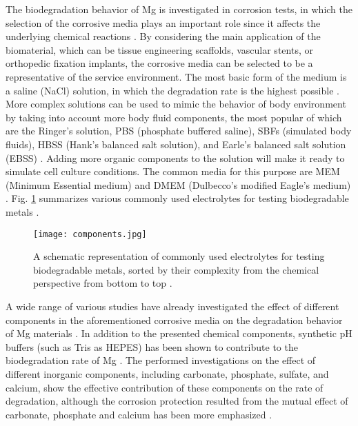 The biodegradation behavior of Mg is investigated in corrosion tests, in which the selection of the corrosive media plays an important role since it affects the underlying chemical reactions \cite{Mei2020}. By considering the main application of the biomaterial, which can be tissue engineering scaffolds, vascular stents, or orthopedic fixation implants, the corrosive media can be selected to be a representative of the service environment. The most basic form of the medium is a saline (NaCl) solution, in which the degradation rate is the highest possible \cite{Mei2020}. More complex solutions can be used to mimic the behavior of body environment by taking into account more body fluid components, the most popular of which are the Ringer's solution, PBS (phosphate buffered saline), SBFs (simulated body fluids), HBSS (Hank's balanced salt solution), and Earle's balanced salt solution (EBSS) \cite{Mei2020}. Adding more organic components to the solution will make it ready to simulate cell culture conditions. The common media for this purpose are MEM (Minimum Essential medium) and DMEM (Dulbecco's modified Eagle's medium) \cite{Mei2020}. Fig. \ref{fig:components} summarizes various commonly used electrolytes for testing biodegradable metals \cite{Mei2020}.


\begin{figure}
\centering
\medskip
\texttt{[image: components.jpg]}
\caption[Commonly used electrolytes for testing biodegradable metals]{A schematic representation of commonly used electrolytes for testing biodegradable metals, sorted by their complexity from the chemical perspective from bottom to top \cite{Mei2020}.} 
\label{fig:components}
\end{figure}

A wide range of various studies have already investigated the effect of different components in the aforementioned corrosive media on the degradation behavior of Mg materials \cite{Mei2019,Zeng2014,Johnston2017, Lamaka2018,Mei2019a}. In addition to the presented chemical components, synthetic pH buffers (such as Tris as HEPES) has been shown to contribute to the biodegradation rate of Mg \cite{Mei2019}. The performed investigations on the effect of different inorganic components, including carbonate, phosphate, sulfate, and calcium, show the effective contribution of these components on the rate of degradation, although the corrosion protection resulted from the mutual effect of carbonate, phosphate and calcium has been more emphasized \cite{Mei2019,Lamaka2018}.




